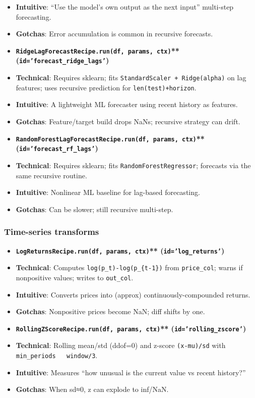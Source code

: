 \documentclass[11pt]{article}
\begin{document}
\begin{itemize}[leftmargin=*,nosep]
\item \textbf{Intuitive}: “Use the model’s own output as the next input” multi-step forecasting.
\item \textbf{Gotchas}: Error accumulation is common in recursive forecasts.
\item \textbf{\texttt{RidgeLagForecastRecipe.run(df, params, ctx)}** (\texttt{id='forecast\_ridge\_lags'})}
\item \textbf{Technical}: Requires sklearn; fits \texttt{StandardScaler + Ridge(alpha)} on lag features; uses recursive prediction for \texttt{len(test)+horizon}.
\item \textbf{Intuitive}: A lightweight ML forecaster using recent history as features.
\item \textbf{Gotchas}: Feature/target build drops NaNs; recursive strategy can drift.
\item \textbf{\texttt{RandomForestLagForecastRecipe.run(df, params, ctx)}** (\texttt{id='forecast\_rf\_lags'})}
\item \textbf{Technical}: Requires sklearn; fits \texttt{RandomForestRegressor}; forecasts via the same recursive routine.
\item \textbf{Intuitive}: Nonlinear ML baseline for lag-based forecasting.
\item \textbf{Gotchas}: Can be slower; still recursive multi-step.
\end{itemize}


\subsubsection{Time-series transforms}

\begin{itemize}[leftmargin=*,nosep]
\item \textbf{\texttt{LogReturnsRecipe.run(df, params, ctx)}** (\texttt{id='log\_returns'})}
\item \textbf{Technical}: Computes \texttt{log(p\_t)-log(p\_\{t-1\})} from \texttt{price\_col}; warns if nonpositive values; writes to \texttt{out\_col}.
\item \textbf{Intuitive}: Converts prices into (approx) continuously-compounded returns.
\item \textbf{Gotchas}: Nonpositive prices become NaN; diff shifts by one.
\item \textbf{\texttt{RollingZScoreRecipe.run(df, params, ctx)}** (\texttt{id='rolling\_zscore'})}
\item \textbf{Technical}: Rolling mean/std (ddof=0) and z-score \texttt{(x-mu)/sd} with \texttt{min\_periods ~ window/3}.
\item \textbf{Intuitive}: Measures “how unusual is the current value vs recent history?”
\item \textbf{Gotchas}: When sd≈0, z can explode to inf/NaN.
\end{itemize}
\end{document}

